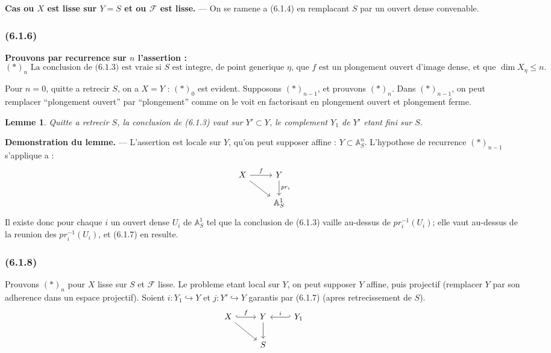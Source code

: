\documentclass[12pt,a4paper]{article}
\theoremstyle{plain}
\newtheorem{lemma}[theorem]{Lemme}
\theoremstyle{definition}
\theoremstyle{remark}
\newcommand{\bbA}{\mathbb{A}}
\newcommand{\scrF}{\mathscr{F}}
\begin{document}
\textbf{Cas ou $X$ est lisse sur $Y = S$ et ou $\scrF$ est lisse.} --- On se ramene a (6.1.4) en remplacant $S$ par un ouvert dense convenable.

\subsubsection*{\textup{(6.1.6)}}

\textbf{Prouvons par recurrence sur $n$ l'assertion :}
\[
(*)_n \text{ La conclusion de (6.1.3) est vraie si $S$ est integre, de point generique $\eta$, que $f$ est un plongement ouvert d'image dense, et que } \dim X_\eta \leq n.
\]

Pour $n = 0$, quitte a retrecir $S$, on a $X = Y$ : $(*)_0$ est evident. Supposons $(*)_{n-1}$, et prouvons $(*)_n$. Dans $(*)_{n-1}$, on peut remplacer ``plongement ouvert'' par ``plongement'' comme on le voit en factorisant en plongement ouvert et plongement ferme.

\begin{lemma}
Quitte a retrecir $S$, la conclusion de (6.1.3) vaut sur $Y' \subset Y$, le complement $Y_1$ de $Y'$ etant fini sur $S$.
\end{lemma}

\textbf{Demonstration du lemme.} --- L'assertion est locale sur $Y$, qu'on peut supposer affine : $Y \subset \bbA^n_S$. L'hypothese de recurrence $(*)_{n-1}$ s'applique a :
\[
\begin{tikzcd}
X \arrow[r, "f"] \arrow[rd] & Y \arrow[d, "pr_i"] \\
& \bbA^1_S
\end{tikzcd}
\]
Il existe donc pour chaque $i$ un ouvert dense $U_i$ de $\bbA^1_S$ tel que la conclusion de (6.1.3) vaille au-dessus de $pr_i^{-1}(U_i)$; elle vaut au-dessus de la reunion des $pr_i^{-1}(U_i)$, et (6.1.7) en resulte.

\subsubsection*{\textup{(6.1.8)}}

Prouvons $(*)_n$ pour $X$ lisse sur $S$ et $\scrF$ lisse. Le probleme etant local sur $Y$, on peut supposer $Y$ affine, puis projectif (remplacer $Y$ par son adherence dans un espace projectif). Soient $i : Y_1 \hookrightarrow Y$ et $j : Y' \hookrightarrow Y$ garantis par (6.1.7) (apres retrecissement de $S$).
\[
\begin{tikzcd}
X \arrow[r, hook, "f"] \arrow[rd] & Y \arrow[d] & Y_1 \arrow[l, hook', "i"'] \\
& S
\end{tikzcd}
\]
\end{document}
